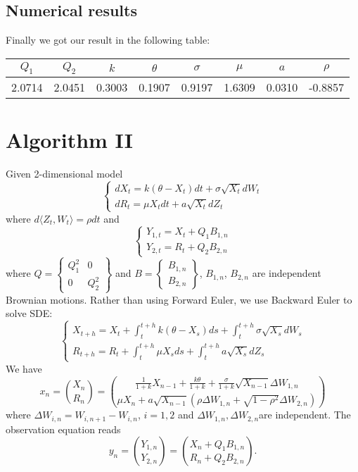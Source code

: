 \documentclass{amsart}
\numberwithin{equation}{section}
\begin{document}
\subsection{Numerical results}
Finally we got our result in the following table:

\begin{table}[!ht]
\begin{tabular}{cccccccc} \hline 
 $Q_{1}$ & $Q_{2}$ & $k$ & $\theta$ & $\sigma$ & $\mu$ & $a$ & $\rho$ 
 \\ \hline 
  2.0714 & 2.0451 &0.3003 & 0.1907 & 0.9197 & 1.6309 & 0.0310 &-0.8857 \\\hline 
\end{tabular}
\end{table}

\section{Algorithm II}
Given 2-dimensional model
$$
\begin{cases}
dX_{t}=k(\theta-X_t)dt+\sigma\sqrt{X_{t}}dW_{t}\\
dR_{t} = \mu X_{t}dt+a\sqrt{X_{t}}dZ_{t}
\end{cases}
$$
where $d\langle Z_{t},W_{t}\rangle=\rho dt$ and 
$$
\begin{cases}
Y_{1,t} = X_{t}+Q_{1} B_{1,n}\\
Y_{2,t} = R_{t}+Q_{2}  B_{2,n}
\end{cases}
$$
where $Q = \left\{
\begin{matrix}
Q_{1}^2 &  0\\
0 & Q_{2}^2
\end{matrix}
\right\}
$ and $B = \left\{
\begin{matrix}
B_{1,n}\\
B_{2,n}
\end{matrix}
\right\}
$, $B_{1,n}$, $B_{2,n}$ are independent Brownian motions.
Rather than using Forward Euler, we use Backward Euler to solve SDE:
$$
\begin{cases}
X_{t+h}=X_{t}+\int_{t}^{t+h}k(\theta-X_{s})ds+\int_{t}^{t+h}\sigma\sqrt{X_{s}}dW_{s}\\ R_{t+h}=R_{t}+\int_{t}^{t+h}\mu X_{s}ds+\int_{t}^{t+h}a\sqrt{X_s}dZ_{s} 
\end{cases}
$$
We have 
$$
x_{n}= \binom{X_{n}}{R_{n} }= 
\binom{
	\frac{1}{1+k}X_{n-1}+\frac{k\theta}{1+k}+\frac{\sigma}{1+k}\sqrt{X_{n-1}}\Delta W_{1,n}}{  \mu X_{n}+a\sqrt{X_{n-1}}(\rho\Delta W_{1,n}+\sqrt{1-\rho^2}\Delta W_{2,n})} 
$$
where $\Delta W_{i,n}=W_{i,n+1}-W_{i,n}$, $i=1,2$ and $\Delta W_{1,n},\Delta W_{2,n}$are independent. 
The observation equation reads 
$$
y_{n}= \binom{Y_{1,n} }{Y_{2,n} }=
\binom{  X_{n}+ {Q_{1}}B_{1,n}}{
	R_{n}+ {Q_{2}}B_{2,n}}.
$$
\end{document}
